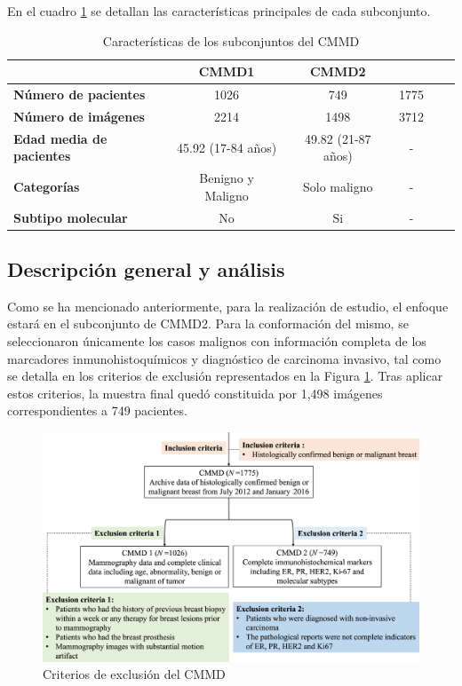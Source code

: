 \documentclass[a4paper,10pt]{book}
\begin{document}
En el cuadro \ref{tab:cmmd_features} se detallan las características principales de cada subconjunto.


\begin{table}
    \centering
    \begin{tabular}{lccccc}
        \toprule
        & \textbf{CMMD1} & \textbf{CMMD2} & \\
        \midrule
        \textbf{Número de pacientes} & 1026 & 749 & 1775\\
        \textbf{Número de imágenes} & 2214 & 1498 & 3712\\
        \textbf{Edad media de pacientes} & 45.92 (17-84 años) & 49.82 (21-87 años) & - \\
        \textbf{Categorías} & Benigno y Maligno & Solo maligno & - \\
        \textbf{Subtipo molecular} & No & Si & - \\
        \bottomrule
    \end{tabular}
    \caption{Características de los subconjuntos del CMMD}
    \label{tab:cmmd_features}
\end{table}


\subsection{Descripción general y análisis}

Como se ha mencionado anteriormente, para la realización de estudio, el enfoque estará en el subconjunto de CMMD2. Para la conformación del mismo, se seleccionaron únicamente los casos malignos con información completa de los marcadores inmunohistoquímicos y diagnóstico de carcinoma invasivo, tal como se detalla en los criterios de exclusión representados en la Figura \ref{fig:cmmd_criteria}. Tras aplicar estos criterios, la muestra final quedó constituida por 1,498 imágenes correspondientes a 749 pacientes.


\begin{figure}[h]
	\centering
	\includegraphics[width=0.8\linewidth]{reports//assets/cmmd_criteria.png}
	\caption{Criterios de exclusión del CMMD \cite{cai_online_2023}}
	\label{fig:cmmd_criteria}
\end{figure}
\end{document}
